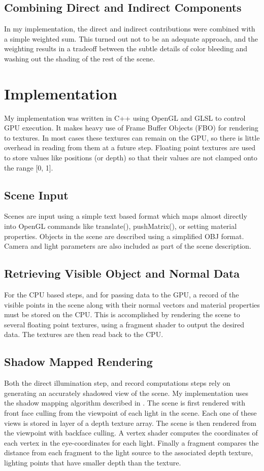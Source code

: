 \documentclass[10pt,twopage]{acmsiggraph}
\begin{document}
\subsection{Combining Direct and Indirect Components}
In my implementation, the direct and indirect contributions were combined with a simple weighted sum.  This turned out not to be an adequate approach, and the weighting results in a tradeoff between the subtle details of color bleeding and washing out the shading of the rest of the scene.

\section{Implementation}
My implementation was written in C++ using OpenGL and GLSL to control GPU execution.  It makes heavy use of Frame Buffer Objects (FBO) for rendering to textures.  In most cases these textures can remain on the GPU, so there is little overhead in reading from them at a future step.  Floating point textures are used to store values like positions (or depth) so that their values are not clamped onto the range [0, 1].

\subsection{Scene Input}
Scenes are input using a simple text based format which maps almost directly into OpenGL commands like translate(), pushMatrix(), or setting material properties.  Objects in the scene are described using a simplified OBJ format.  Camera and light parameters are also included as part of the scene description.

\subsection{Retrieving Visible Object and Normal Data}
For the CPU based steps, and for passing data to the GPU, a record of the visible points in the scene along with their normal vectors and material properties must be stored on the CPU.  This is accomplished by rendering the scene to several floating point textures, using a fragment shader to output the desired data.  The textures are then read back to the CPU.  

\subsection{Shadow Mapped Rendering}
Both the direct illumination step, and record computations steps rely on generating an accurately shadowed view of the scene.  My implementation uses the shadow mapping algorithm described in \cite{orangebook}.  The scene is first rendered with front face culling from the viewpoint of each light in the scene.  Each one of these views is stored in layer of a depth texture array.  The scene is then rendered from the viewpoint with backface culling.  A vertex shader computes the coordinates of each vertex in the eye-coordinates for each light.  Finally a fragment compares the distance from each fragment to the light source to the associated depth texture, lighting points that have smaller depth than the texture.  
\end{document}

